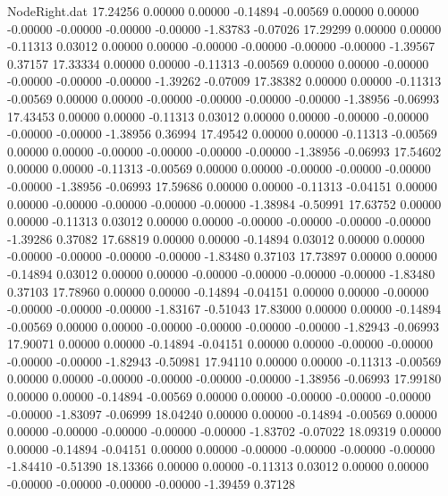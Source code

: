 \begin{filecontents}{NodeRight.dat}
  17.24256    0.00000    0.00000    -0.14894   -0.00569    0.00000    0.00000   -0.00000   -0.00000   -0.00000   -0.00000   -1.83783   -0.07026
  17.29299    0.00000    0.00000    -0.11313    0.03012    0.00000    0.00000   -0.00000   -0.00000   -0.00000   -0.00000   -1.39567    0.37157
  17.33334    0.00000    0.00000    -0.11313   -0.00569    0.00000    0.00000   -0.00000   -0.00000   -0.00000   -0.00000   -1.39262   -0.07009
  17.38382    0.00000    0.00000    -0.11313   -0.00569    0.00000    0.00000   -0.00000   -0.00000   -0.00000   -0.00000   -1.38956   -0.06993
  17.43453    0.00000    0.00000    -0.11313    0.03012    0.00000    0.00000   -0.00000   -0.00000   -0.00000   -0.00000   -1.38956    0.36994
  17.49542    0.00000    0.00000    -0.11313   -0.00569    0.00000    0.00000   -0.00000   -0.00000   -0.00000   -0.00000   -1.38956   -0.06993
  17.54602    0.00000    0.00000    -0.11313   -0.00569    0.00000    0.00000   -0.00000   -0.00000   -0.00000   -0.00000   -1.38956   -0.06993
  17.59686    0.00000    0.00000    -0.11313   -0.04151    0.00000    0.00000   -0.00000   -0.00000   -0.00000   -0.00000   -1.38984   -0.50991
  17.63752    0.00000    0.00000    -0.11313    0.03012    0.00000    0.00000   -0.00000   -0.00000   -0.00000   -0.00000   -1.39286    0.37082
  17.68819    0.00000    0.00000    -0.14894    0.03012    0.00000    0.00000   -0.00000   -0.00000   -0.00000   -0.00000   -1.83480    0.37103
  17.73897    0.00000    0.00000    -0.14894    0.03012    0.00000    0.00000   -0.00000   -0.00000   -0.00000   -0.00000   -1.83480    0.37103
  17.78960    0.00000    0.00000    -0.14894   -0.04151    0.00000    0.00000   -0.00000   -0.00000   -0.00000   -0.00000   -1.83167   -0.51043
  17.83000    0.00000    0.00000    -0.14894   -0.00569    0.00000    0.00000   -0.00000   -0.00000   -0.00000   -0.00000   -1.82943   -0.06993
  17.90071    0.00000    0.00000    -0.14894   -0.04151    0.00000    0.00000   -0.00000   -0.00000   -0.00000   -0.00000   -1.82943   -0.50981
  17.94110    0.00000    0.00000    -0.11313   -0.00569    0.00000    0.00000   -0.00000   -0.00000   -0.00000   -0.00000   -1.38956   -0.06993
  17.99180    0.00000    0.00000    -0.14894   -0.00569    0.00000    0.00000   -0.00000   -0.00000   -0.00000   -0.00000   -1.83097   -0.06999
  18.04240    0.00000    0.00000    -0.14894   -0.00569    0.00000    0.00000   -0.00000   -0.00000   -0.00000   -0.00000   -1.83702   -0.07022
  18.09319    0.00000    0.00000    -0.14894   -0.04151    0.00000    0.00000   -0.00000   -0.00000   -0.00000   -0.00000   -1.84410   -0.51390
  18.13366    0.00000    0.00000    -0.11313    0.03012    0.00000    0.00000   -0.00000   -0.00000   -0.00000   -0.00000   -1.39459    0.37128

\end{filecontents}

